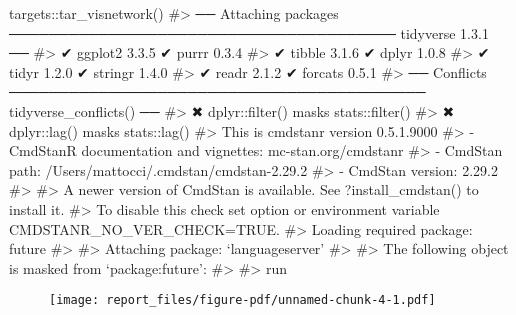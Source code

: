 \documentclass[
  11pt,
  letterpaper,
  DIV=11,
  numbers=noendperiod]{scrartcl}
\newenvironment{Shaded}{}{}
\newcommand{\CommentTok}[1]{\textcolor[rgb]{0.42,0.45,0.49}{#1}}
\newcommand{\FunctionTok}[1]{\textcolor[rgb]{0.44,0.26,0.76}{#1}}
\newcommand{\NormalTok}[1]{\textcolor[rgb]{0.14,0.16,0.18}{#1}}
\newcommand{\SpecialCharTok}[1]{\textcolor[rgb]{0.00,0.36,0.77}{#1}}
\begin{document}
\begin{Shaded}
\begin{Highlighting}[]
\NormalTok{targets}\SpecialCharTok{::}\FunctionTok{tar\_visnetwork}\NormalTok{()}
\CommentTok{\#\textgreater{} ── Attaching packages ─────────────────────────────────────── tidyverse 1.3.1 ──}
\CommentTok{\#\textgreater{} ✔ ggplot2 3.3.5     ✔ purrr   0.3.4}
\CommentTok{\#\textgreater{} ✔ tibble  3.1.6     ✔ dplyr   1.0.8}
\CommentTok{\#\textgreater{} ✔ tidyr   1.2.0     ✔ stringr 1.4.0}
\CommentTok{\#\textgreater{} ✔ readr   2.1.2     ✔ forcats 0.5.1}
\CommentTok{\#\textgreater{} ── Conflicts ────────────────────────────────────────── tidyverse\_conflicts() ──}
\CommentTok{\#\textgreater{} ✖ dplyr::filter() masks stats::filter()}
\CommentTok{\#\textgreater{} ✖ dplyr::lag()    masks stats::lag()}
\CommentTok{\#\textgreater{} This is cmdstanr version 0.5.1.9000}
\CommentTok{\#\textgreater{} {-} CmdStanR documentation and vignettes: mc{-}stan.org/cmdstanr}
\CommentTok{\#\textgreater{} {-} CmdStan path: /Users/mattocci/.cmdstan/cmdstan{-}2.29.2}
\CommentTok{\#\textgreater{} {-} CmdStan version: 2.29.2}
\CommentTok{\#\textgreater{} }
\CommentTok{\#\textgreater{} A newer version of CmdStan is available. See ?install\_cmdstan() to install it.}
\CommentTok{\#\textgreater{} To disable this check set option or environment variable CMDSTANR\_NO\_VER\_CHECK=TRUE.}
\CommentTok{\#\textgreater{} Loading required package: future}
\CommentTok{\#\textgreater{} }
\CommentTok{\#\textgreater{} Attaching package: ‘languageserver’}
\CommentTok{\#\textgreater{} }
\CommentTok{\#\textgreater{} The following object is masked from ‘package:future’:}
\CommentTok{\#\textgreater{} }
\CommentTok{\#\textgreater{}     run}
\end{Highlighting}
\end{Shaded}

\begin{figure}[H]

{\centering \texttt{[image: report\_files/figure-pdf/unnamed-chunk-4-1.pdf]}

}

\end{figure}
\end{document}
